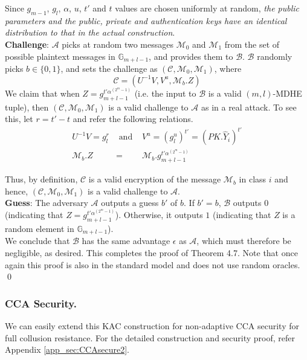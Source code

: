 \noindent Since $g_{m-1}$, $g_{l}$, $\alpha$, $u$, $t'$ and $t$ values are chosen uniformly at random, \emph{the public parameters and the public, private and authentication keys have an identical distribution to that in the actual construction}.\\
 
\noindent \textbf{Challenge}: $\mathcal{A}$ picks at random two messages $\mathcal{M}_0$ and $\mathcal{M}_1$ from the set of possible plaintext messages in $\mathbb{G}_{m+l-1}$, and provides them to $\mathcal{B}$. $\mathcal{B}$ randomly picks $b\in\{0,1\}$, and sets the challenge as $(\mathcal{C},\mathcal{M}_0,\mathcal{M}_1)$, where 
\begin{equation}
 \mathcal{C}=(U^{-1}V,V^u,\mathcal{M}_b.Z) \nonumber
\end{equation}
\noindent We claim that when $Z=g^{t'\alpha^{(2^m-1)}}_{m+l-1}$ (i.e. the input to $\mathcal{B}$ is a valid $(m,l)$-MDHE tuple), then $(\mathcal{C},\mathcal{M}_0,\mathcal{M}_1)$ is a valid challenge to $\mathcal{A}$ as in a real attack. To see this, let $r=t'-t$ and refer the following relations.
\begin{eqnarray}
U^{-1}V=g^r_{l}   &\text{ and }&   V^u= \left(g^u_{l}\right)^{t'}=(PK.\hat{Y}_i)^{t'}\nonumber \\
\mathcal{M}_b.Z&=&\mathcal{M}_b.g^{t'\alpha^{(2^m-1)}}_{m+l-1}\nonumber
\end{eqnarray}

\noindent Thus, by definition, $\mathcal{C}$ is a valid encryption of the message $\mathcal{M}_b$ in class $i$ and hence, $(\mathcal{C},\mathcal{M}_0,\mathcal{M}_1)$ is a valid challenge to $\mathcal{A}$. \\
 
\noindent \textbf{Guess}: The adversary $\mathcal{A}$ outputs a guess $b'$ of $b$. If $b' = b$, $\mathcal{B}$ outputs $0$ (indicating that $Z=g^{t'\alpha^{(2^m-1)}}_{m+l-1}$). Otherwise, it outputs $1$ (indicating that $Z$ is a random element in $\mathbb{G}_{m+l-1}$).\\ 

\noindent We conclude that $\mathcal{B}$ has the same advantage $\epsilon$ as $\mathcal{A}$, which must therefore be negligible, as desired. This completes the proof of Theorem 4.7. Note that once again this proof is also in the standard model and does not use random oracles. \hfill\qed 

\subsubsection{CCA Security.} We can easily extend this KAC construction for non-adaptive CCA security for full collusion resistance. For the detailed construction and security proof, refer Appendix \ref{app_sec:CCAsecure2}.

